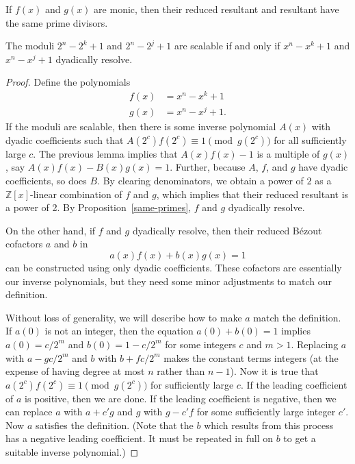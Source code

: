 \documentclass[10pt,a4paper]{amsart}
\newcommand{\tri}[3]{\ensuremath{#1^{#2} - #1^{#3} + 1}}
\begin{document}
\begin{proposition}
    \label{same-primes}
    If $f(x)$ and $g(x)$ are monic, then their reduced resultant and resultant
    have the same prime divisors.
\end{proposition}

\begin{theorem}
    The moduli $2^n - 2^k + 1$ and $2^n - 2^j + 1$ are scalable if and only if $\tri{x}{n}{k}$ and $\tri{x}{n}{j}$ dyadically resolve.
\end{theorem}

\begin{proof}
    Define the polynomials
    \begin{align*}
        f(x) &= x^n - x^k + 1 \\
        g(x) &= x^n - x^j + 1.
    \end{align*}
    If the moduli are scalable, then there is some inverse
    polynomial $A(x)$ with dyadic coefficients such that $A(2^c) f(2^c) \equiv
    1 \pmod{g(2^c)}$ for all sufficiently large $c$. The previous lemma implies
    that $A(x) f(x) - 1$ is a multiple of $g(x)$, say $A(x) f(x) - B(x) g(x) =
    1$. Further, because $A$, $f$, and $g$ have dyadic coefficients, so does
    $B$. By clearing denominators, we obtain a power of $2$ as a
    $\mathbb{Z}[x]$-linear combination of $f$ and $g$, which implies that their
    reduced resultant is a power of 2. By Proposition~\ref{same-primes}, $f$
    and $g$ dyadically resolve.

    On the other hand, if $f$ and $g$ dyadically resolve, then their reduced
    B\'ezout cofactors $a$ and $b$ in
    \begin{equation*}
        a(x) f(x) + b(x) g(x) = 1
    \end{equation*}
    can be constructed using only dyadic coefficients. These cofactors are
    essentially our inverse polynomials, but they need some minor adjustments to
    match our definition.

    Without loss of generality, we will describe how to make $a$ match the
    definition. If $a(0)$ is not an integer, then the equation $a(0) + b(0) = 1$
    implies $a(0) = c/2^m$ and $b(0) = 1 - c/2^m$ for some integers $c$ and $m >
    1$. Replacing $a$ with $a - gc / 2^m$ and $b$ with $b + fc / 2^m$ makes the
    constant terms integers (at the expense of having degree at most $n$ rather
    than $n - 1$). Now it is true that $a(2^c) f(2^c) \equiv 1 \pmod{g(2^c)}$
    for sufficiently large $c$. If the leading coefficient of $a$ is positive,
    then we are done. If the leading coefficient is negative, then we can
    replace $a$ with $a + c' g$ and $g$ with $g - c' f$ for some sufficiently
    large integer $c'$. Now $a$ satisfies the definition. (Note that the $b$
    which results from this process has a negative leading coefficient. It must
    be repeated in full on $b$ to get a suitable inverse polynomial.)
\end{proof}
\end{document}
